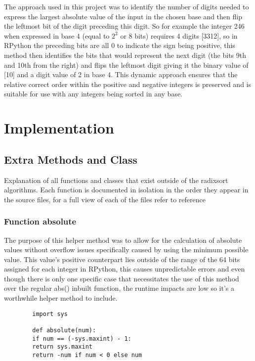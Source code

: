 \documentclass[12pt]{article}
\begin{document}
	\newline
	The approach used in this project was to identify the number of digits needed to express the largest absolute value of the input in the chosen base and then flip the leftmost bit of the digit preceding this digit. So for example the integer 246 when expressed in base 4  (equal to $2^{2}$ or 8 bits) requires 4 digits [3312], so in RPython the preceding bits are all 0 to indicate the sign being positive, this method then identifies the bits that would represent the next digit (the bits 9th and 10th from the right) and flips the leftmost digit giving it the binary value of [10] and a digit value of 2 in base 4. This dynamic approach ensures that the relative correct order within the positive and negative integers is preserved  and is suitable for use with any integers being sorted in any base.


	
	



\section{Implementation}
\subsection{Extra Methods and Class}
Explanation of all functions and classes that exist outside of the  radixsort algorithms. Each function is documented in isolation in the order they appear in the source files, for a full view of each of the files refer to {\color{red}reference}
\subsubsection{Function absolute}
The purpose of this helper method was to allow for the calculation of absolute values without overflow issues specifically caused by using the minimum possible value. This value's positive counterpart lies outside of the range of the 64 bits assigned for each integer in RPython, this causes unpredictable errors and even though there is only one specific case that necessitates the use of this method over the regular abs() inbuilt function, the runtime impacts are low so it's a worthwhile helper method to include.
\begin{lstlisting}
        import sys
        
        def absolute(num):
        if num == (-sys.maxint) - 1:
        return sys.maxint
        return -num if num < 0 else num
\end{lstlisting}
\end{document}
